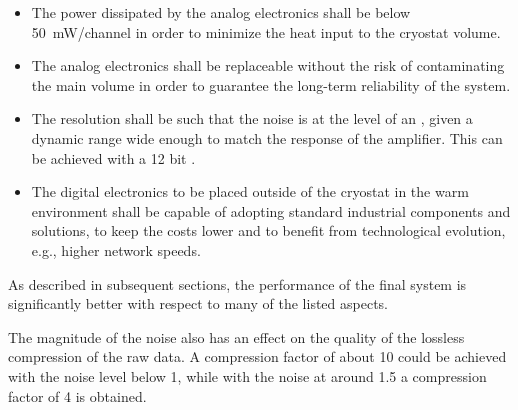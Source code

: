 \begin{itemize}
\item{The power dissipated by the  analog electronics %
shall be below \SI{50}{\milli\watt/channel} in order to minimize the heat input to the cryostat volume.}

\item{The  analog electronics %
shall be replaceable without the risk of contaminating the main \lar volume in order to guarantee the long-term reliability of the system.}

\item{The  resolution %
shall be such that the noise is at 
 the level of an , %
given a dynamic range wide enough to match the response of the  amplifier. This can be achieved with a \num{12} bit .}

\item{The digital electronics to be placed outside of the cryostat in the warm environment %
shall be capable of adopting standard industrial components and solutions, to keep the costs lower and to benefit from  %
technological evolution, e.g., higher network speeds.}
\end{itemize}
As described %
in subsequent sections, the performance of the final system is significantly better with respect to many of the listed aspects.  

The magnitude of the noise also %
has an effect on the quality of the lossless compression of the raw data. %
A compression factor of about \num{10} could be achieved with the \rms noise level below \SI{1}{}, while with the noise at around \SI{1.5}{} a compression factor of \num{4} is obtained. 


